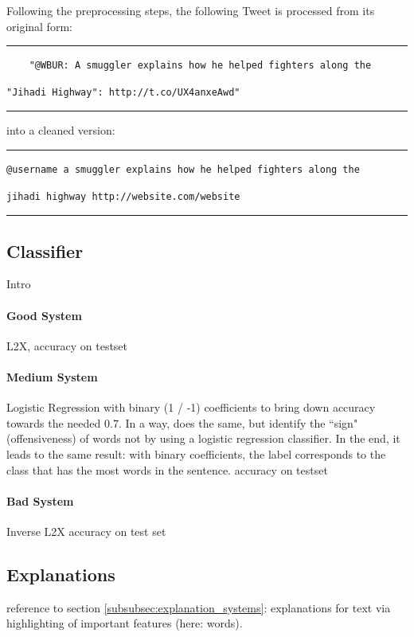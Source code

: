 Following the preprocessing steps, the following Tweet is processed from its original form:
\medskip \hrule \medskip
\begin{verbatim}
	"@WBUR: A smuggler explains how he helped fighters along the \end{verbatim}\begin{verbatim}"Jihadi Highway": http://t.co/UX4anxeAwd"
\end{verbatim}
\medskip \hrule \medskip
into a cleaned version:
\medskip \hrule \medskip
\begin{verbatim}
@username a smuggler explains how he helped fighters along the \end{verbatim}\begin{verbatim}jihadi highway http://website.com/website
\end{verbatim}
\medskip \hrule \medskip





\subsection{Classifier}
Intro

\paragraph{Good System}
L2X, accuracy on testset

\paragraph{Medium System}
Logistic Regression with binary (1 / -1) coefficients to bring down accuracy towards the needed 0.7. In a way, \cite{klenner2018offensive} does the same, but identify the ``sign" (offensiveness) of words not by using a logistic regression classifier. In the end, it leads to the same result: with binary coefficients, the label corresponds to the class that has the most words in the sentence.
accuracy on testset

\paragraph{Bad System}
Inverse L2X
accuracy on test set



\subsection{Explanations}
reference to section \ref{subsubsec:explanation_systems}: explanations for text via highlighting of important features (here: words). 

